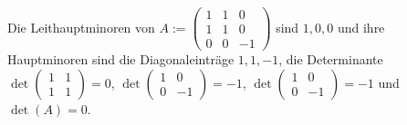 \documentclass[../../main.tex]{subfiles}
\begin{document}
\begin{bsp}\label{14.2.10}
Die Leithauptminoren von $A:=\begin{pmatrix*}1&1&0\\1&1&0\\ 0&0&-1\end{pmatrix*}$ sind $1,0,0$ und ihre Hauptminoren sind die Diagonaleinträge $1,1,-1$, die Determinante $\det\begin{pmatrix*}1&1\\1&1\end{pmatrix*}=0$, $\det\begin{pmatrix*}1&0\\0&-1\end{pmatrix*}=-1$, $\det\begin{pmatrix*}1&0\\0&-1\end{pmatrix*}=-1$ und $\det(A)=0$.
\end{bsp}
\end{document}
